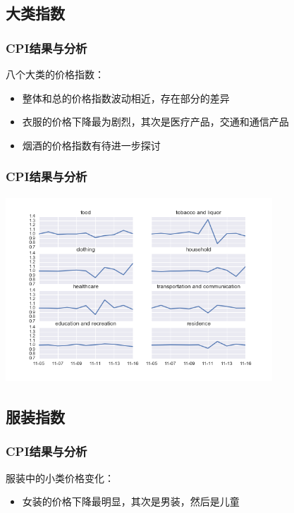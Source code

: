 \documentclass{beamer}
\begin{document}
\subsection{大类指数}
\begin{frame}
\frametitle{CPI结果与分析}
八个大类的价格指数：
\begin{itemize}
  \item 整体和总的价格指数波动相近，存在部分的差异
  \item 衣服的价格下降最为剧烈，其次是医疗产品，交通和通信产品
  \item 烟酒的价格指数有待进一步探讨
\end{itemize}
\end{frame}
\begin{frame}
\frametitle{CPI结果与分析}
\includegraphics[width=10cm,height=7cm]{double11_8cate.png}
\end{frame}

\subsection{服装指数}
\begin{frame}
\frametitle{CPI结果与分析}
服装中的小类价格变化：
\begin{itemize}
  \item 女装的价格下降最明显，其次是男装，然后是儿童
\end{itemize}
\end{frame}
\section{}
\end{document}
